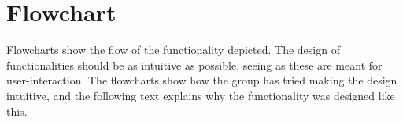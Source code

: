 \section{Flowchart}
Flowcharts show the flow of the functionality depicted. The design of functionalities should be as intuitive as possible, seeing as these are meant for user-interaction. The flowcharts show how the group has tried making the design intuitive, and the following text explains why the functionality was designed like this.

